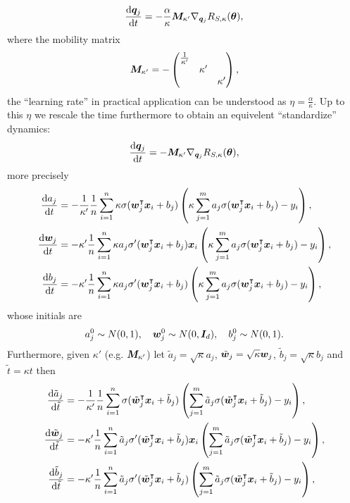 \documentclass{article}
\begin{document}
\begin{equation}
    \frac{\mathrm{d}\bm{q}_j}{\mathrm{d} t} = -\frac{\alpha}{\kappa}\bm{M}_{\kappa'}\nabla_{\bm{q}_j}R_{S,\kappa}(\bm{\theta}),
\end{equation}
where the mobility matrix
\begin{equation}
    \bm{M}_{\kappa'} = -
    \begin{pmatrix}
        \frac{1}{\kappa'} &         &         \\
                          & \kappa' &         \\
                          &         & \kappa'
    \end{pmatrix},
\end{equation}
the ``learning rate'' in practical application can be understood as $\eta = \frac{\alpha}{\kappa}$. Up to this $\eta$ we rescale the time furthermore to obtain an equivelent ``standardize'' dynamics:
\begin{equation}
    \frac{\mathrm{d} \bm{q}_j}{\mathrm{d} t} = -\bm{M}_{\kappa'}\nabla_{\bm{q}_j}R_{S, \kappa}(\bm{\theta}),
\end{equation}
more precisely
\begin{align*}
    \frac{\mathrm{d} a_j}{\mathrm{d} t}
     & = -\frac{1}{\kappa'}\frac{1}{n}\sum_{i=1}^n \kappa\sigma(\bm{w}_j^\intercal\bm{x}_i+b_j) \left(\kappa\sum_{j=1}^{m}a_j\sigma(\bm{w}_j^\intercal\bm{x}_i+b_j)-y_i\right), \\
    \frac{\mathrm{d} \bm{w}_j}{\mathrm{d} t}
     & = -\kappa'\frac{1}{n}\sum_{i=1}^n\kappa a_j\sigma'(\bm{w}_j^\intercal\bm{x}_i+b_j)\bm{x}_i \left(\kappa\sum_{j=1}^{m}a_j\sigma(\bm{w}_j^\intercal\bm{x}_i+b_j)-y_i\right),  \\
    \frac{\mathrm{d} b_j}{\mathrm{d} t}
     & = -\kappa'\frac{1}{n}\sum_{i=1}^n\kappa a_j\sigma'(\bm{w}_j^\intercal\bm{x}_i+b_j) \left(\kappa\sum_{j=1}^{m}a_j\sigma(\bm{w}_j^\intercal\bm{x}_i+b_j)-y_i\right),
\end{align*}
whose initials are
\begin{equation}
    a_j^0\sim N(0,1), \quad \bm{w}_j^0\sim N(0,\bm{I}_d), \quad b_j^0\sim N(0, 1).
\end{equation}
Furthermore, given $\kappa'$ (e.g. $\bm{M}_{\kappa'}$) let $\tilde{a}_j = \sqrt{\kappa}a_j$, $\tilde{\bm{w}}_j = \sqrt{\kappa}\bm{w}_j$, $\tilde{b}_j=\sqrt{\kappa}b_j$ and $\tilde{t}=\kappa t$ then
\begin{align*}
    \frac{\mathrm{d} \tilde{a}_j}{\mathrm{d} \tilde{t}}
     & = -\frac{1}{\kappa'}\frac{1}{n}\sum_{i=1}^n\sigma(\tilde{\bm{w}}_j^\intercal\bm{x}_i+\tilde{b}_j) \left(\sum_{j=1}^{m}\tilde{a}_j\sigma(\tilde{\bm{w}}_j^\intercal\bm{x}_i+\tilde{b}_j)-y_i\right),        \\
    \frac{\mathrm{d} \tilde{\bm{w}}_j}{\mathrm{d} \tilde{t}}
     & = -\kappa'\frac{1}{n}\sum_{i=1}^n\tilde{a}_j\sigma'(\tilde{\bm{w}}_j^\intercal\bm{x}_i+\tilde{b}_j)\bm{x}_i \left(\sum_{j=1}^{m}\tilde{a}_j\sigma(\tilde{\bm{w}}_j^\intercal\bm{x}_i+\tilde{b}_j)-y_i\right), \\
    \frac{\mathrm{d} \tilde{b}_j}{\mathrm{d} \tilde{t}}
     & = -\kappa'\frac{1}{n}\sum_{i=1}^n\tilde{a}_j\sigma'(\tilde{\bm{w}}_j^\intercal\bm{x}_i+\tilde{b}_j) \left(\sum_{j=1}^{m}\tilde{a}_j\sigma(\tilde{\bm{w}}_j^\intercal\bm{x}_i+\tilde{b}_j)-y_i\right),
\end{align*}
\end{document}
